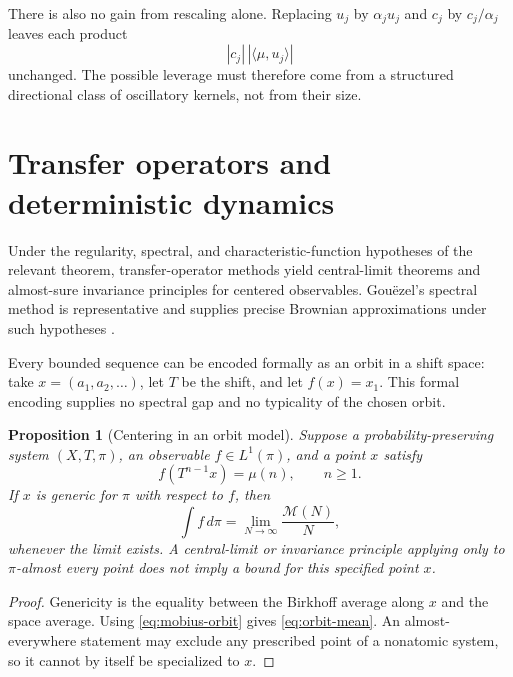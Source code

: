 \documentclass[11pt]{amsart}
\numberwithin{equation}{section}
\theoremstyle{plain}
\newtheorem{proposition}[theorem]{Proposition}
\theoremstyle{definition}
\theoremstyle{remark}
\newcommand{\Mertens}{\mathcal M}
\begin{document}
There is also no gain from rescaling alone.  Replacing \(u_j\) by
\(\alpha_j u_j\) and \(c_j\) by \(c_j/\alpha_j\) leaves each product
\begin{equation}\label{eq:scale-invariant-cost}
  |c_j|\,|\langle\mu,u_j\rangle|
\end{equation}
unchanged.  The possible leverage must therefore come from a structured
directional class of oscillatory kernels, not from their size.

\section{Transfer operators and deterministic dynamics}\label{sec:transfer-operators}

Under the regularity, spectral, and characteristic-function hypotheses of the
relevant theorem, transfer-operator methods yield central-limit theorems and
almost-sure invariance principles for centered observables.  Gou\"ezel's
spectral method is representative and supplies precise Brownian approximations
under such hypotheses \cite{Gouezel2010}.

Every bounded sequence can be encoded formally as an orbit in a shift space:
take \(x=(a_1,a_2,\ldots)\), let \(T\) be the shift, and let
\(f(x)=x_1\).  This formal encoding supplies no spectral gap and no typicality
of the chosen orbit.

\begin{proposition}[Centering in an orbit model]\label{prop:orbit-centering}
Suppose a probability-preserving system \((X,T,\pi)\), an observable
\(f\in L^1(\pi)\), and a point \(x\) satisfy
\begin{equation}\label{eq:mobius-orbit}
  f(T^{n-1}x)=\mu(n),\qquad n\geq1.
\end{equation}
If \(x\) is generic for \(\pi\) with respect to \(f\), then
\begin{equation}\label{eq:orbit-mean}
  \int f\,d\pi=\lim_{N\to\infty}\frac{\Mertens(N)}{N},
\end{equation}
whenever the limit exists.  A central-limit or invariance principle applying
only to \(\pi\)-almost every point does not imply a bound for this specified
point \(x\).
\end{proposition}

\begin{proof}
Genericity is the equality between the Birkhoff average along \(x\) and the
space average.  Using \eqref{eq:mobius-orbit} gives \eqref{eq:orbit-mean}.
An almost-everywhere statement may exclude any prescribed point of a nonatomic
system, so it cannot by itself be specialized to \(x\).
\end{proof}
\end{document}
